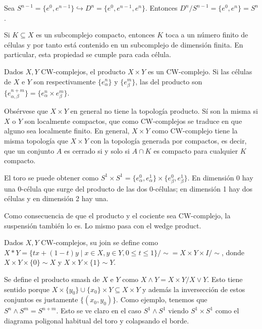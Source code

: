 \documentclass[TA.tex]{subfiles}
\begin{document}
\begin{ej}[cociente]
Sea $S^{n-1}=\{e^0, e^{n-1}\}\hookrightarrow D^n=\{e^0, e^{n-1}, e^n\}$. Entonces $D^n/S^{n-1}=\{e^0, e^n\}=S^n$. 
\end{ej}

\begin{observacion}
Si $K\subseteq X$ es un subcomplejo compacto, entonces $K$ toca a un número finito de células y por tanto está contenido en un subcomplejo de dimensión finita. En particular, esta propiedad se cumple para cada célula.
\end{observacion}

\begin{prop}
Dados $X,Y$ CW-complejos, el producto $X\times Y$ es un CW-complejo. Si las células de $X$ e $Y$ son respectivamente $\{e_\alpha^n\}$ y $\{e_{\beta}^m\}$, las del producto son $\{e_{\alpha,\beta}^{n+m}\}=\{e_\alpha^n\times e_\beta^m\}$.
\end{prop}

Obsérvese que $X\times Y$ en general no tiene la topología producto. Sí son la misma si $X$ o $Y$ son localmente compactos, que como CW-complejos se traduce en que alguno sea localmente finito. En general, $X\times Y$ como CW-complejo tiene la misma topología que $X\times Y$ con la topología generada por compactos, es decir, que un conjunto $A$ es cerrado si y solo si $A\cap K$ es compacto para cualquier $K$ compacto. 

\begin{ej}
El toro se puede obtener como $S^1\times S^1=\{e_{\alpha}^0,e_{\alpha}^1\}\times \{e_\beta^0,e_\beta^1\}$. En dimensión 0 hay una 0-célula que surge del producto de las dos 0-células; en dimensión 1 hay dos células y en dimensión 2 hay una. 
\end{ej}

Como consecuencia de que el producto y el cociente sea CW-complejo, la suspensión también lo es. Lo mismo pasa con el wedge product.

\begin{ej}[Join]
Dados $X,Y$ CW-complejos, su join se define como $X*Y=\{tx+(1-t)y\mid  x\in X,y\in Y, 0\leq t\leq 1\}/\sim =X\times Y\times I/\sim$, donde $X\times Y\times\{0\}\sim X$ y $X\times Y\times \{1\}\sim Y$. 
\end{ej}

\begin{ej}
Se define el producto smash de $X$ e $Y$ como $X\land Y=X\times Y/X\lor Y$. Esto tiene sentido porque $X\times \{y_0\}\cup\{x_0\}\times Y\subseteq X\times Y$ y además la inversección de estos conjuntos es justamente $\{(x_0, y_0)\}$. Como ejemplo, tenemos que $S^n\land S^m=S^{n+m}$. Esto se ve claro en el caso $S^1\land S^1$ viendo $S^1\times S^1$ como el diagrama poligonal habitual del toro y colapsando el borde. 
\end{ej}
\end{document}
